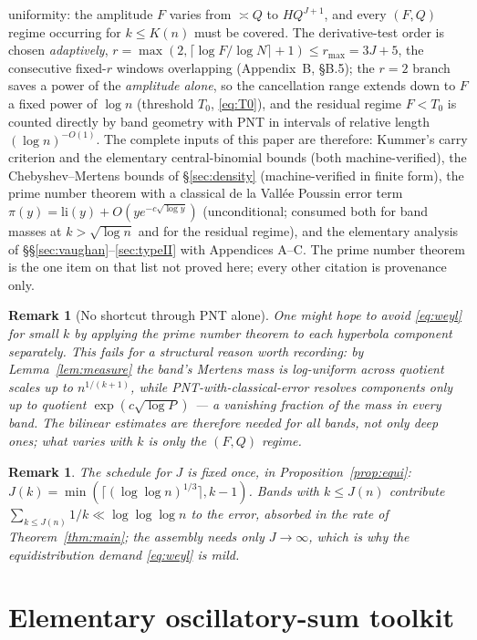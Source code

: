 \documentclass[11pt]{article}
\newtheorem{remark}[theorem]{Remark}
\theoremstyle{definition}
\theoremstyle{plain}
\begin{document}
uniformity: the amplitude $F$ varies from $\asymp Q$ to $HQ^{J+1}$, and
every $(F,Q)$ regime occurring for $k\le K(n)$ must be covered.  The
derivative-test order is chosen \emph{adaptively},
$r=\max(2,\lceil\log F/\log N\rceil+1)\le r_{\max}=3J+5$, the
consecutive fixed-$r$ windows overlapping (Appendix~B, \S B.5); the
$r=2$ branch saves a power of the \emph{amplitude alone}, so the
cancellation range extends down to $F$ a fixed power of $\log n$
(threshold $T_0$, \eqref{eq:T0}), and the residual regime
$F<T_0$ is counted directly by band geometry with PNT in intervals of
relative length $(\log n)^{-O(1)}$.  The complete inputs of this paper
are therefore: Kummer's carry criterion and the elementary
central-binomial bounds (both machine-verified), the Chebyshev--Mertens
bounds of \S\ref{sec:density} (machine-verified in finite form), the
prime number theorem with a classical de la Vall\'ee Poussin error term
$\pi(y)=\mathrm{li}(y)+O(ye^{-c\sqrt{\log y}})$ (unconditional; consumed
both for band masses at $k>\sqrt{\log n}$ and for the residual regime),
and the elementary analysis of
\S\S\ref{sec:vaughan}--\ref{sec:typeII} with Appendices A--C.  The prime
number theorem is the one item on that list not proved here; every other
citation is provenance only.

\begin{remark}[No shortcut through PNT alone]\label{rem:noshortcut}
One might hope to avoid \eqref{eq:weyl} for small $k$ by applying the
prime number theorem to each hyperbola component separately.  This fails
for a structural reason worth recording: by Lemma~\ref{lem:measure} the
band's Mertens mass is log-uniform across quotient scales up to
$n^{1/(k+1)}$, while PNT-with-classical-error resolves components only up
to quotient $\exp(c\sqrt{\log P})$ --- a vanishing fraction of the mass in
every band.  The bilinear estimates are therefore needed for \emph{all}
bands, not only deep ones; what varies with $k$ is only the $(F,Q)$
regime.
\end{remark}

\begin{remark}
The schedule for $J$ is fixed once, in Proposition~\ref{prop:equi}:
$J(k)=\min(\lceil(\log\log n)^{1/3}\rceil,k-1)$.  Bands with
$k\le J(n)$ contribute $\sum_{k\le J(n)}1/k\ll\log\log\log n$ to the
error, absorbed in the rate of Theorem~\ref{thm:main}; the assembly
needs only $J\to\infty$, which is why the equidistribution demand
\eqref{eq:weyl} is mild.
\end{remark}

\section{Elementary oscillatory-sum toolkit}\label{sec:typeI}
\end{document}
